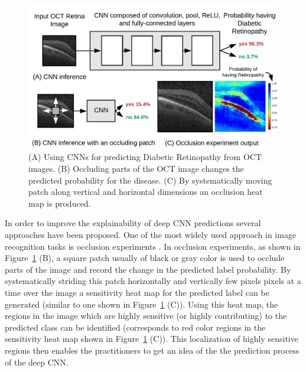 \begin{figure}[t]
  \includegraphics[width=\columnwidth]{./images/krypton_overview}
  \caption{(A) Using CNNs for predicting Diabetic Retinopathy from OCT images. (B) Occluding parts of the OCT image changes the predicted probability for the disease. (C) By systematically moving patch along vertical and horizontal dimensions an occlusion heat map is produced.}
  \label{fig:krypton_overview}
\end{figure}

In order to improve the explainability of deep CNN predictions several approaches have been proposed.
One of the most widely used approach in image recognition tasks is occlusion experiments \cite{zeiler2014visualizing}.
In occlusion experiments, as shown in Figure~\ref{fig:krypton_overview} (B), a square patch usually of black or gray color is used to occlude parts of the image and record the change in the predicted label probability.
By systematically striding this patch horizontally and vertically few pixels pixels at a time over the image a sensitivity heat map for the predicted label can be generated (similar to one shown in Figure~\ref{fig:krypton_overview} (C)).
Using this heat map, the regions in the image which are highly sensitive (or highly contributing) to the predicted class can be identified (corresponds to red color regions in the sensitivity heat map shown in Figure~\ref{fig:krypton_overview} (C)).
This localization of highly sensitive regions then enables the practitioners to get an idea of the the prediction process of the deep CNN.

